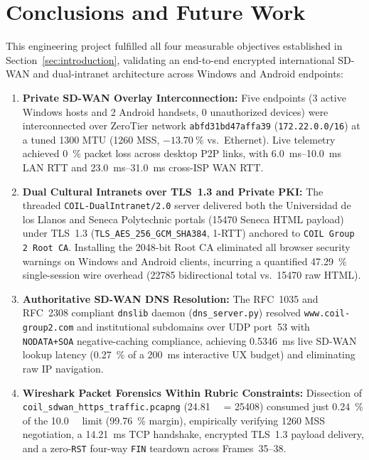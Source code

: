 \section{Conclusions and Future Work}
\label{sec:conclusions}

This engineering project fulfilled all four measurable objectives established in Section~\ref{sec:introduction}, validating an end-to-end encrypted international SD-WAN and dual-intranet architecture across Windows and Android endpoints:

\begin{enumerate}
    \item \textbf{Private SD-WAN Overlay Interconnection:} Five endpoints (\num{3} active Windows hosts and \num{2} Android handsets, \num{0} unauthorized devices) were interconnected over ZeroTier network \texttt{abfd31bd47affa39} (\texttt{172.22.0.0/16}) at a tuned \qty{1300}{\byte} MTU (\qty{1260}{\byte} MSS, $-\qty{13.70}{\percent}$ vs.\ Ethernet). Live telemetry achieved \qty{0}{\percent} packet loss across desktop P2P links, with \qty{6.0}{\milli\second}--\qty{10.0}{\milli\second} LAN RTT and \qty{23.0}{\milli\second}--\qty{31.0}{\milli\second} cross-ISP WAN RTT.

    \item \textbf{Dual Cultural Intranets over TLS~1.3 and Private PKI:} The threaded \texttt{COIL-DualIntranet/2.0} server delivered both the Universidad de los Llanos and Seneca Polytechnic portals (\qty{15470}{\byte} Seneca HTML payload) under TLS~1.3 (\nolinkurl{TLS_AES_256_GCM_SHA384}, 1-RTT) anchored to \texttt{COIL Group 2 Root CA}. Installing the 2048-bit Root CA eliminated all browser security warnings on Windows and Android clients, incurring a quantified \qty{47.29}{\percent} single-session wire overhead (\qty{22785}{\byte} bidirectional total vs.\ \qty{15470}{\byte} raw HTML).

    \item \textbf{Authoritative SD-WAN DNS Resolution:} The RFC~1035 and RFC~2308 compliant \texttt{dnslib} daemon (\texttt{dns\_server.py}) resolved \nolinkurl{www.coil-group2.com} and institutional subdomains over UDP port~53 with \texttt{NODATA+SOA} negative-caching compliance, achieving \qty{0.5346}{\milli\second} live SD-WAN lookup latency (\qty{0.27}{\percent} of a \qty{200}{\milli\second} interactive UX budget) and eliminating raw IP navigation.

    \item \textbf{Wireshark Packet Forensics Within Rubric Constraints:} Dissection of \nolinkurl{coil_sdwan_https_traffic.pcapng} (\qty{24.81}{\kilo\byte} = \qty{25408}{\byte}) consumed just \qty{0.24}{\percent} of the \qty{10.0}{\mega\byte} limit (\qty{99.76}{\percent} margin), empirically verifying \qty{1260}{\byte} MSS negotiation, a \qty{14.21}{\milli\second} TCP handshake, encrypted TLS~1.3 payload delivery, and a zero-\texttt{RST} four-way \texttt{FIN} teardown across Frames~35--38.
\end{enumerate}

